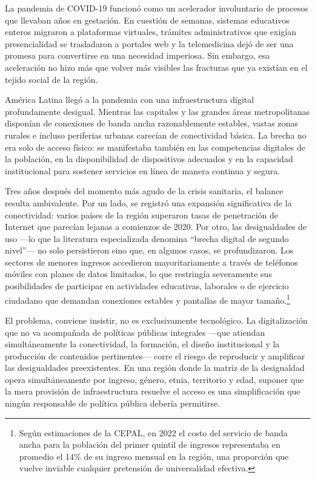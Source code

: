 La pandemia de COVID-19 funcionó como un acelerador involuntario de procesos que llevaban años en gestación. En cuestión de semanas, sistemas educativos enteros migraron a plataformas virtuales, trámites administrativos que exigían presencialidad se trasladaron a portales web y la telemedicina dejó de ser una promesa para convertirse en una necesidad imperiosa. Sin embargo, esa aceleración no hizo más que volver más visibles las fracturas que ya existían en el tejido social de la región.

América Latina llegó a la pandemia con una infraestructura digital profundamente desigual. Mientras las capitales y las grandes áreas metropolitanas disponían de conexiones de banda ancha razonablemente estables, vastas zonas rurales e incluso periferias urbanas carecían de conectividad básica. La brecha no era solo de acceso físico: se manifestaba también en las competencias digitales de la población, en la disponibilidad de dispositivos adecuados y en la capacidad institucional para sostener servicios en línea de manera continua y segura.

Tres años después del momento más agudo de la crisis sanitaria, el balance resulta ambivalente. Por un lado, se registró una expansión significativa de la conectividad: varios países de la región superaron tasas de penetración de Internet que parecían lejanas a comienzos de 2020. Por otro, las desigualdades de uso —lo que la literatura especializada denomina “brecha digital de segundo nivel”— no solo persistieron sino que, en algunos casos, se profundizaron. Los sectores de menores ingresos accedieron mayoritariamente a través de teléfonos móviles con planes de datos limitados, lo que restringía severamente sus posibilidades de participar en actividades educativas, laborales o de ejercicio ciudadano que demandan conexiones estables y pantallas de mayor tamaño.\footnote{Según estimaciones de la CEPAL, en 2022 el costo del servicio de
banda ancha para la población del primer quintil de ingresos
representaba en promedio el 14\% de su ingreso mensual en la región, una
proporción que vuelve inviable cualquier pretensión de universalidad
efectiva.}

El problema, conviene insistir, no es exclusivamente tecnológico. La digitalización que no va acompañada de políticas públicas integrales —que atiendan simultáneamente la conectividad, la formación, el diseño institucional y la producción de contenidos pertinentes— corre el riesgo de reproducir y amplificar las desigualdades preexistentes. En una región donde la matriz de la desigualdad opera simultáneamente por ingreso, género, etnia, territorio y edad, suponer que la mera provisión de infraestructura resuelve el acceso es una simplificación que ningún responsable de política pública debería permitirse.

